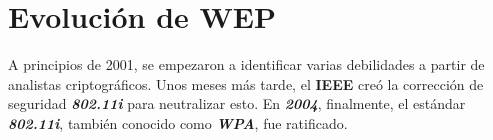 \documentclass[
]{article}
\begin{document}
\hypertarget{evoluciuxf3n-de-wep}{%
\section{Evolución de WEP}\label{evoluciuxf3n-de-wep}}

A principios de 2001, se empezaron a identificar varias debilidades a
partir de analistas criptográficos. Unos meses más tarde, el
\textbf{IEEE} creó la corrección de seguridad \textbf{\emph{802.11i}}
para neutralizar esto. En \textbf{\emph{2004}}, finalmente, el estándar
\textbf{\emph{802.11i}}, también conocido como \textbf{\emph{WPA}}, fue
ratificado.
\end{document}
